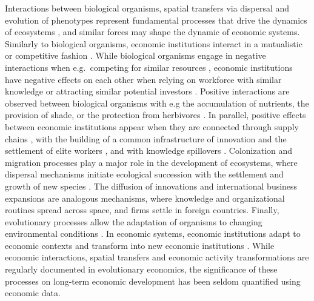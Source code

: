   Interactions between biological organisms, spatial transfers via dispersal and evolution of phenotypes represent fundamental processes that drive the dynamics of ecosystems \cite{Vellend2010}, and similar forces may shape the dynamic of economic systems.
  Similarly to biological organisms, economic institutions interact in a mutualistic or competitive fashion \cite{Pistorius1997}. While biological organisms engage in negative interactions when e.g.~competing for similar resources \cite{GRIME1973}, economic institutions have negative effects on each other when relying on workforce with similar knowledge or attracting similar potential investors \cite{Wernerfelt1989}.
  Positive interactions are observed between biological organisms with e.g the accumulation of nutrients, the provision of shade, or the protection from herbivores \cite{Wernerfelt1989,Callaway2002}. In parallel, positive effects between economic institutions appear when they are connected through supply chains \cite{Ozman2009,Saavedra2009a}, with the building of a common infrastructure of innovation and the settlement of elite workers \cite{Cohendet2018}, and with knowledge spillovers \cite{Menon2015}.
  Colonization and migration processes play a major role in the development of ecosystems, where dispersal mechanisms initiate ecological succession with the settlement and growth of new species \cite{Leibold2004}. The diffusion of innovations \cite{RogersEverettM2003DoI} and international business expansions \cite{Zahra2000} are analogous mechanisms, where knowledge and organizational routines spread across space, and firms settle in foreign countries.
  Finally, evolutionary processes allow the adaptation of organisms to changing environmental conditions \cite{Bell2017}. In economic systems, economic institutions adapt to economic contexts \cite{Cordes2006} and transform into new economic institutions \cite{Freeman2002,Hodgson2004,Aldrich2008}. %
  While economic interactions, spatial transfers and economic activity transformations are regularly documented in evolutionary economics, the significance of these processes on long-term economic development has been seldom quantified using economic data.%

